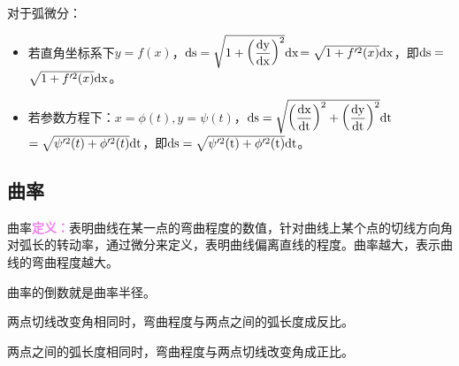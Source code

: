 \documentclass[UTF8, 12pt]{ctexart}
\begin{document}
对于弧微分：

\begin{itemize}
    \item 若直角坐标系下$y=f(x)$，$\rm{d}s=\sqrt{1+\left(\dfrac{\rm{d}y}{\rm{d}x}\right)^2}\rm{d}x$$=\sqrt{1+f'^2(x)}\rm{d}x$，即$\rm{d}s=$$\sqrt{1+f'^2(x)}\rm{d}x$。
    \item 若参数方程下：$x=\phi(t),y=\psi(t)$，$\rm{d}s=\sqrt{\left(\dfrac{\rm{d}x}{\rm{d}t}\right)^2+\left(\dfrac{\rm{d}y}{\rm{d}t}\right)^2}\rm{d}t$\medskip\\$=\sqrt{\psi'^2(t)+\phi'^2(t)}\rm{d}t$，即$\rm{d}s=\sqrt{\psi'^2(t)+\phi'^2(t)}\rm{d}t$。
\end{itemize}

\subsection{曲率}

曲率\textcolor{violet}{\textbf{定义：}}表明曲线在某一点的弯曲程度的数值，针对曲线上某个点的切线方向角对弧长的转动率，通过微分来定义，表明曲线偏离直线的程度。曲率越大，表示曲线的弯曲程度越大。

曲率的倒数就是曲率半径。\medskip

\begin{minipage}{0.5\linewidth}
    两点切线改变角相同时，弯曲程度与两点之间的弧长度成反比。

    两点之间的弧长度相同时，弯曲程度与两点切线改变角成正比。
\end{minipage}
\hfill
\begin{minipage}{0.2\linewidth}
\end{minipage}
\hfill
\begin{minipage}{0.2\linewidth}
\end{minipage}
\end{document}
